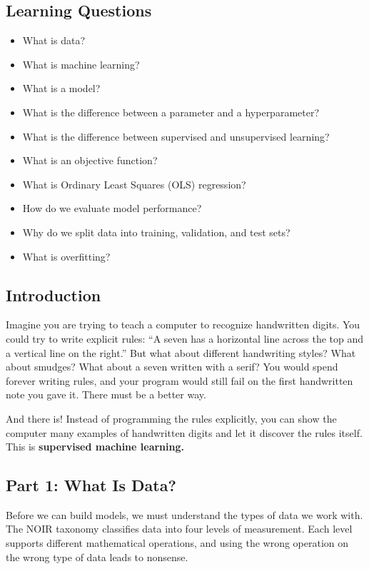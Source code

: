 \subsection*{Learning Questions}
\begin{itemize}
    \item What is data?
    \item What is machine learning?
    \item What is a model?
    \item What is the difference between a parameter and a hyperparameter?
    \item What is the difference between supervised and unsupervised learning?
    \item What is an objective function?
    \item What is Ordinary Least Squares (OLS) regression?
    \item How do we evaluate model performance?
    \item Why do we split data into training, validation, and test sets?
    \item What is overfitting?
\end{itemize}

\subsection*{Introduction}
Imagine you are trying to teach a computer to recognize handwritten digits. You could try to write explicit rules: ``A seven has a horizontal line across the top and a vertical line on the right.'' But what about different handwriting styles? What about smudges? What about a seven written with a serif? You would spend forever writing rules, and your program would still fail on the first handwritten note you gave it. There must be a better way.

And there is! Instead of programming the rules explicitly, you can show the computer many examples of handwritten digits and let it discover the rules itself. This is \textbf{supervised machine learning.}

\subsection*{Part 1: What Is Data?}
Before we can build models, we must understand the types of data we work with. The NOIR taxonomy classifies data into four levels of measurement. Each level supports different mathematical operations, and using the wrong operation on the wrong type of data leads to nonsense.


